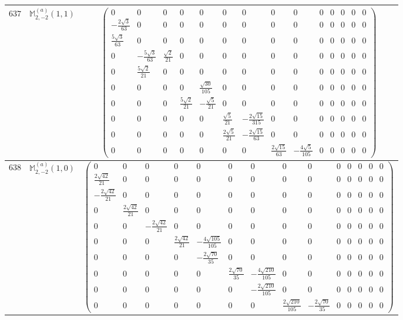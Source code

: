 \documentclass[fleqn,8pt,landscape]{jsarticle}
\begin{document}
\begin{center}
\begin{longtable}{ccc}
$ 637 $ & $ \mathbb{M}_{2,-2}^{(a)}(1,1) $ & $ \begin{pmatrix} 0 & 0 & 0 & 0 & 0 & 0 & 0 & 0 & 0 & 0 & 0 & 0 & 0 & 0 \\ - \frac{2 \sqrt{3}}{63} & 0 & 0 & 0 & 0 & 0 & 0 & 0 & 0 & 0 & 0 & 0 & 0 & 0 \\ \frac{5 \sqrt{3}}{63} & 0 & 0 & 0 & 0 & 0 & 0 & 0 & 0 & 0 & 0 & 0 & 0 & 0 \\ 0 & - \frac{5 \sqrt{3}}{63} & \frac{\sqrt{2}}{21} & 0 & 0 & 0 & 0 & 0 & 0 & 0 & 0 & 0 & 0 & 0 \\ 0 & \frac{5 \sqrt{2}}{21} & 0 & 0 & 0 & 0 & 0 & 0 & 0 & 0 & 0 & 0 & 0 & 0 \\ 0 & 0 & 0 & 0 & \frac{\sqrt{30}}{105} & 0 & 0 & 0 & 0 & 0 & 0 & 0 & 0 & 0 \\ 0 & 0 & 0 & \frac{5 \sqrt{2}}{21} & - \frac{\sqrt{5}}{21} & 0 & 0 & 0 & 0 & 0 & 0 & 0 & 0 & 0 \\ 0 & 0 & 0 & 0 & 0 & \frac{\sqrt{5}}{21} & - \frac{2 \sqrt{15}}{315} & 0 & 0 & 0 & 0 & 0 & 0 & 0 \\ 0 & 0 & 0 & 0 & 0 & \frac{2 \sqrt{5}}{21} & - \frac{2 \sqrt{15}}{63} & 0 & 0 & 0 & 0 & 0 & 0 & 0 \\ 0 & 0 & 0 & 0 & 0 & 0 & 0 & \frac{2 \sqrt{15}}{63} & - \frac{4 \sqrt{5}}{105} & 0 & 0 & 0 & 0 & 0 \end{pmatrix} $ \\ \hline
$ 638 $ & $ \mathbb{M}_{2,-2}^{(a)}(1,0) $ & $ \begin{pmatrix} 0 & 0 & 0 & 0 & 0 & 0 & 0 & 0 & 0 & 0 & 0 & 0 & 0 & 0 \\ \frac{2 \sqrt{42}}{21} & 0 & 0 & 0 & 0 & 0 & 0 & 0 & 0 & 0 & 0 & 0 & 0 & 0 \\ - \frac{2 \sqrt{42}}{21} & 0 & 0 & 0 & 0 & 0 & 0 & 0 & 0 & 0 & 0 & 0 & 0 & 0 \\ 0 & \frac{2 \sqrt{42}}{21} & 0 & 0 & 0 & 0 & 0 & 0 & 0 & 0 & 0 & 0 & 0 & 0 \\ 0 & 0 & - \frac{2 \sqrt{42}}{21} & 0 & 0 & 0 & 0 & 0 & 0 & 0 & 0 & 0 & 0 & 0 \\ 0 & 0 & 0 & \frac{2 \sqrt{42}}{21} & - \frac{4 \sqrt{105}}{105} & 0 & 0 & 0 & 0 & 0 & 0 & 0 & 0 & 0 \\ 0 & 0 & 0 & 0 & - \frac{2 \sqrt{70}}{35} & 0 & 0 & 0 & 0 & 0 & 0 & 0 & 0 & 0 \\ 0 & 0 & 0 & 0 & 0 & \frac{2 \sqrt{70}}{35} & - \frac{4 \sqrt{210}}{105} & 0 & 0 & 0 & 0 & 0 & 0 & 0 \\ 0 & 0 & 0 & 0 & 0 & 0 & - \frac{2 \sqrt{210}}{105} & 0 & 0 & 0 & 0 & 0 & 0 & 0 \\ 0 & 0 & 0 & 0 & 0 & 0 & 0 & \frac{2 \sqrt{210}}{105} & - \frac{2 \sqrt{70}}{35} & 0 & 0 & 0 & 0 & 0 \end{pmatrix} $ \\ \hline

\end{longtable}
\end{center}
\end{document}
